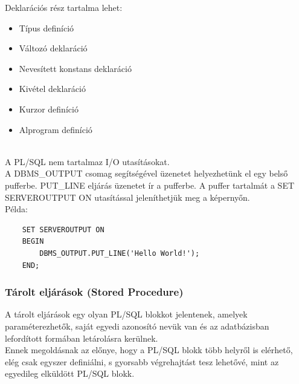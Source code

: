 \documentclass[tikz,12pt,margin=0px]{article}
\begin{document}
    \noindent Deklarációs rész tartalma lehet:
    \begin{itemize}
        \item Típus definíció
        \item Változó deklaráció
        \item Nevesített konstans deklaráció
        \item Kivétel deklaráció
        \item Kurzor definíció
        \item Alprogram definíció
    \end{itemize}
    \ \\
    \noindent A PL/SQL nem tartalmaz I/O utasításokat.\\

    \noindent A DBMS\_OUTPUT csomag segítségével üzenetet helyezhetünk el egy belső pufferbe. PUT\_LINE eljárás üzenetet ír a pufferbe. A puffer tartalmát a SET SERVEROUTPUT ON utasítással jeleníthetjük meg a képernyőn.\\

    \noindent Példa:
{\small
\begin{verbatim}
    SET SERVEROUTPUT ON
    BEGIN
        DBMS_OUTPUT.PUT_LINE('Hello World!');
    END;
\end{verbatim}
}

    \subsubsection*{Tárolt eljárások (Stored Procedure)}

    \noindent A tárolt eljárások egy olyan PL/SQL blokkot jelentenek, amelyek paraméterezhetők, saját egyedi azonosító nevük van és az adatbázisban lefordított formában letárolásra kerülnek.\\
    Ennek megoldásnak az előnye, hogy a PL/SQL blokk több helyről is elérhető, elég csak egyszer definiálni, s gyorsabb végrehajtást tesz lehetővé, mint az egyedileg elküldött PL/SQL blokk.\\
\end{document}
